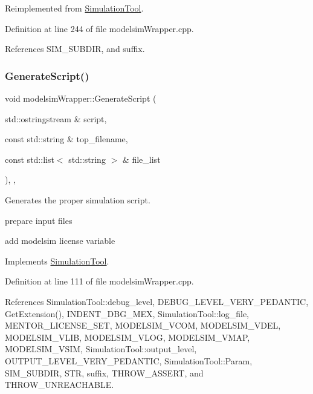 Reimplemented from \hyperlink{classSimulationTool_a200fbae071dc751132117e922cf8ffc3}{Simulation\+Tool}.



Definition at line 244 of file modelsim\+Wrapper.\+cpp.



References S\+I\+M\+\_\+\+S\+U\+B\+D\+IR, and suffix.

\mbox{\label{classmodelsimWrapper_a5eaa08f8c0b15b12a72046e04f290b86}} 
\subsubsection{\texorpdfstring{Generate\+Script()}{GenerateScript()}}
{\footnotesize\ttfamily void modelsim\+Wrapper\+::\+Generate\+Script (\begin{DoxyParamCaption}\item[{std\+::ostringstream \&}]{script,  }\item[{const std\+::string \&}]{top\+\_\+filename,  }\item[{const std\+::list$<$ std\+::string $>$ \&}]{file\+\_\+list }\end{DoxyParamCaption})\hspace{0.3cm}{\ttfamily [override]}, {\ttfamily [private]}, {\ttfamily [virtual]}}



Generates the proper simulation script. 

prepare input files

add modelsim license variable 

Implements \hyperlink{classSimulationTool_afd99529bb7adb46081071097ceae7643}{Simulation\+Tool}.



Definition at line 111 of file modelsim\+Wrapper.\+cpp.



References Simulation\+Tool\+::debug\+\_\+level, D\+E\+B\+U\+G\+\_\+\+L\+E\+V\+E\+L\+\_\+\+V\+E\+R\+Y\+\_\+\+P\+E\+D\+A\+N\+T\+IC, Get\+Extension(), I\+N\+D\+E\+N\+T\+\_\+\+D\+B\+G\+\_\+\+M\+EX, Simulation\+Tool\+::log\+\_\+file, M\+E\+N\+T\+O\+R\+\_\+\+L\+I\+C\+E\+N\+S\+E\+\_\+\+S\+ET, M\+O\+D\+E\+L\+S\+I\+M\+\_\+\+V\+C\+OM, M\+O\+D\+E\+L\+S\+I\+M\+\_\+\+V\+D\+EL, M\+O\+D\+E\+L\+S\+I\+M\+\_\+\+V\+L\+IB, M\+O\+D\+E\+L\+S\+I\+M\+\_\+\+V\+L\+OG, M\+O\+D\+E\+L\+S\+I\+M\+\_\+\+V\+M\+AP, M\+O\+D\+E\+L\+S\+I\+M\+\_\+\+V\+S\+IM, Simulation\+Tool\+::output\+\_\+level, O\+U\+T\+P\+U\+T\+\_\+\+L\+E\+V\+E\+L\+\_\+\+V\+E\+R\+Y\+\_\+\+P\+E\+D\+A\+N\+T\+IC, Simulation\+Tool\+::\+Param, S\+I\+M\+\_\+\+S\+U\+B\+D\+IR, S\+TR, suffix, T\+H\+R\+O\+W\+\_\+\+A\+S\+S\+E\+RT, and T\+H\+R\+O\+W\+\_\+\+U\+N\+R\+E\+A\+C\+H\+A\+B\+LE.

